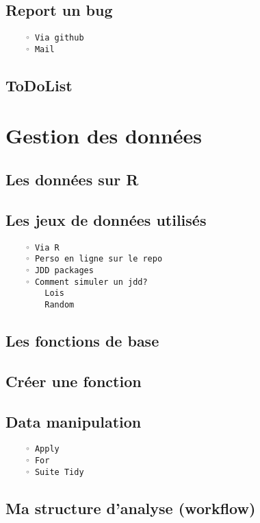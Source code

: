 \documentclass[
]{book}
\begin{document}
\hypertarget{report-un-bug}{%
\section{Report un bug}\label{report-un-bug}}

\begin{verbatim}
    ◦ Via github
    ◦ Mail
\end{verbatim}

\hypertarget{todolist}{%
\section{ToDoList}\label{todolist}}

\hypertarget{gestion-des-donnuxe9es}{%
\chapter{Gestion des données}\label{gestion-des-donnuxe9es}}

\hypertarget{les-donnuxe9es-sur-r}{%
\section{Les données sur R}\label{les-donnuxe9es-sur-r}}

\hypertarget{les-jeux-de-donnuxe9es-utilisuxe9s}{%
\section{Les jeux de données utilisés}\label{les-jeux-de-donnuxe9es-utilisuxe9s}}

\begin{verbatim}
    ◦ Via R
    ◦ Perso en ligne sur le repo
    ◦ JDD packages
    ◦ Comment simuler un jdd?
        Lois 
        Random 
\end{verbatim}

\hypertarget{les-fonctions-de-base}{%
\section{Les fonctions de base}\label{les-fonctions-de-base}}

\hypertarget{cruxe9er-une-fonction}{%
\section{Créer une fonction}\label{cruxe9er-une-fonction}}

\hypertarget{data-manipulation}{%
\section{Data manipulation}\label{data-manipulation}}

\begin{verbatim}
    ◦ Apply
    ◦ For
    ◦ Suite Tidy
\end{verbatim}

\hypertarget{ma-structure-danalyse-workflow}{%
\section{Ma structure d'analyse (workflow)}\label{ma-structure-danalyse-workflow}}

  
\end{document}
